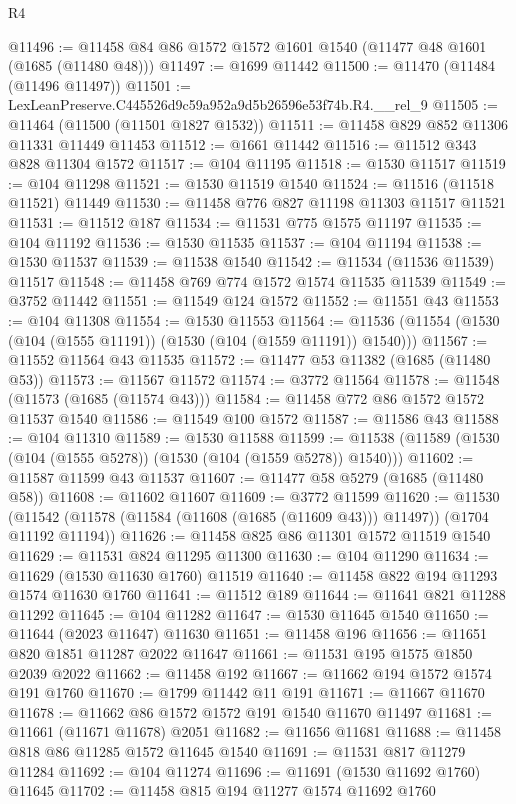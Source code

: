 \begin{lexlean}{R4}
\begin{coremodule}
@11496 := @11458 @84 @86 @1572 @1572 @1601 @1540 (@11477 @48 @1601 (@1685 (@11480 @48)))
@11497 := @1699 @11442
@11500 := @11470 (@11484 (@11496 @11497))
@11501 := LexLeanPreserve.C445526d9c59a952a9d5b26596e53f74b.R4.__rel_9
@11505 := @11464 (@11500 (@11501 @1827 @1532))
@11511 := @11458 @829 @852 @11306 @11331 @11449 @11453
@11512 := @1661 @11442
@11516 := @11512 @343 @828 @11304 @1572
@11517 := @104 @11195
@11518 := @1530 @11517
@11519 := @104 @11298
@11521 := @1530 @11519 @1540
@11524 := @11516 (@11518 @11521) @11449
@11530 := @11458 @776 @827 @11198 @11303 @11517 @11521
@11531 := @11512 @187
@11534 := @11531 @775 @1575 @11197
@11535 := @104 @11192
@11536 := @1530 @11535
@11537 := @104 @11194
@11538 := @1530 @11537
@11539 := @11538 @1540
@11542 := @11534 (@11536 @11539) @11517
@11548 := @11458 @769 @774 @1572 @1574 @11535 @11539
@11549 := @3752 @11442
@11551 := @11549 @124 @1572
@11552 := @11551 @43
@11553 := @104 @11308
@11554 := @1530 @11553
@11564 := @11536 (@11554 (@1530 (@104 (@1555 @11191)) (@1530 (@104 (@1559 @11191)) @1540)))
@11567 := @11552 @11564 @43 @11535
@11572 := @11477 @53 @11382 (@1685 (@11480 @53))
@11573 := @11567 @11572
@11574 := @3772 @11564
@11578 := @11548 (@11573 (@1685 (@11574 @43)))
@11584 := @11458 @772 @86 @1572 @1572 @11537 @1540
@11586 := @11549 @100 @1572
@11587 := @11586 @43
@11588 := @104 @11310
@11589 := @1530 @11588
@11599 := @11538 (@11589 (@1530 (@104 (@1555 @5278)) (@1530 (@104 (@1559 @5278)) @1540)))
@11602 := @11587 @11599 @43 @11537
@11607 := @11477 @58 @5279 (@1685 (@11480 @58))
@11608 := @11602 @11607
@11609 := @3772 @11599
@11620 := @11530
    (@11542 (@11578 (@11584 (@11608 (@1685 (@11609 @43))) @11497)) (@1704 @11192 @11194))
@11626 := @11458 @825 @86 @11301 @1572 @11519 @1540
@11629 := @11531 @824 @11295 @11300
@11630 := @104 @11290
@11634 := @11629 (@1530 @11630 @1760) @11519
@11640 := @11458 @822 @194 @11293 @1574 @11630 @1760
@11641 := @11512 @189
@11644 := @11641 @821 @11288 @11292
@11645 := @104 @11282
@11647 := @1530 @11645 @1540
@11650 := @11644 (@2023 @11647) @11630
@11651 := @11458 @196
@11656 := @11651 @820 @1851 @11287 @2022 @11647
@11661 := @11531 @195 @1575 @1850 @2039 @2022
@11662 := @11458 @192
@11667 := @11662 @194 @1572 @1574 @191 @1760
@11670 := @1799 @11442 @11 @191
@11671 := @11667 @11670
@11678 := @11662 @86 @1572 @1572 @191 @1540 @11670 @11497
@11681 := @11661 (@11671 @11678) @2051
@11682 := @11656 @11681
@11688 := @11458 @818 @86 @11285 @1572 @11645 @1540
@11691 := @11531 @817 @11279 @11284
@11692 := @104 @11274
@11696 := @11691 (@1530 @11692 @1760) @11645
@11702 := @11458 @815 @194 @11277 @1574 @11692 @1760

\end{coremodule}
\end{lexlean}
